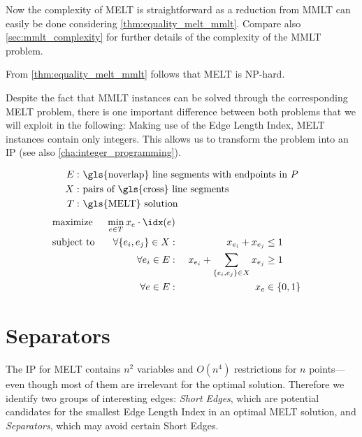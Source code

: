 Now the complexity of \gls{MELT} is straightforward as a reduction
from \gls{MMLT} can easily be done considering
\cref{thm:equality_melt_mmlt}. Compare also \cref{sec:mmlt_complexity}
for further details of the complexity of the \gls{MMLT} problem.

\begin{theorem}
  From \cref{thm:equality_melt_mmlt} follows
  that \gls{MELT} is NP-hard.
\end{theorem}

Despite the fact that \gls{MMLT} instances can be solved through the
corresponding \gls{MELT} problem, there is one important difference
between both problems that we will exploit in the following: Making
use of the Edge Length Index, \gls{MELT} instances contain only
integers. This allows us to transform the problem into an \gls{IP}
(see also \cref{cha:integer_programming}).

\begin{problem}
  \hfill
  \begin{alignat*}{1}
    E: &~ \text{\gls{noverlap} line segments with endpoints in \(P\)} \\
    X: &~ \text{pairs of \gls{cross} line segments} \\
    T: &~ \text{\gls{MELT} solution}
  \end{alignat*}
  \begin{alignat*}{3}
    &\text{maximize } & \min\limits_{e \in T} x_e \cdot \idx(e) \\
    &\text{subject to } & \forall \{e_i,e_j\} \in X : &~& x_{e_i} + x_{e_j} &\leq 1 \\
    && \forall e_i \in E : &~
      & x_{e_i} + \sum\limits_{\{e_i, e_j\} \in X} x_{e_j} &\geq 1 \\
    && \forall e \in E : &~& x_e &\in \{0,1\}
  \end{alignat*}
\end{problem}

\section{Separators}
The \gls{IP} for \gls{MELT} contains \(n^2\) variables and
\(O(n^4)\) restrictions for \(n\) points---even though most of them
are irrelevant for the optimal solution. Therefore we identify two
groups of interesting edges: \emph{Short Edges}, which are potential
candidates for the smallest Edge Length Index in an optimal
\gls{MELT} solution, and \emph{Separators}, which may avoid certain
Short Edges.

